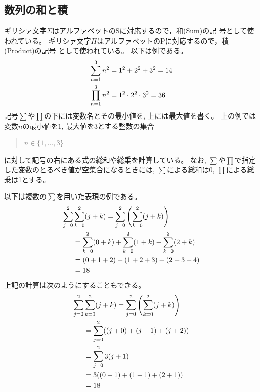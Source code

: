 \documentclass[twocolumn,11pt]{jarticle}
\begin{document}

\subsection{数列の和と積}
ギリシァ文字$\Sigma$はアルファベットのSに対応するので，和(Sum)の記
号として使われている\index{$\sum$}。
ギリシァ文字$\Pi$はアルファベットのPに対応するので，積(Product)の記号
として使われている\index{$\prod$}。
以下は例である。
\begin{align}
 \sum_{n=1}^3n^2&=1^2+2^2+3^2=14\notag\\
 \prod_{n=1}^3n^2&=1^2\cdot 2^2\cdot 3^2=36\notag
\end{align}
記号$\sum$や$\prod$の下には変数名とその最小値を, 上には最大値を書く。
上の例では変数$n$の最小値を$1$, 最大値を$3$とする整数の集合
\begin{quote}
  $n\in\{1,\ldots,3\}$
\end{quote}
に対して記号の右にある式の総和や総乗を計算している。
なお, $\sum$や$\prod$で指定した変数のとるべき値が空集合になるときには, 
$\sum$による総和は0, $\prod$による総乗は1とする。

以下は複数の$\sum$を用いた表現の例である。
\begin{align}
 \sum_{j=0}^2&\sum_{k=0}^2(j+k)=\sum_{j=0}^2\left(\sum_{k=0}^2(j+k)\right)\notag\\
 &=\sum_{k=0}^2(0+k)+\sum_{k=0}^2(1+k)+\sum_{k=0}^2(2+k)\notag\\
 &=(0+1+2)+(1+2+3)+(2+3+4)\notag\\
 &=18\notag
\end{align}
上記の計算は次のようにすることもできる。
\begin{align}
 \sum_{j=0}^2&\sum_{k=0}^2(j+k)=\sum_{j=0}^2\left(\sum_{k=0}^2(j+k)\right)\notag\\
 &=\sum_{j=0}^2((j+0)+(j+1)+(j+2))\notag\\
 &=\sum_{j=0}^23(j+1)\notag\\
 &=3((0+1)+(1+1)+(2+1))\notag\\
 &=18\notag
\end{align}
\end{document}
